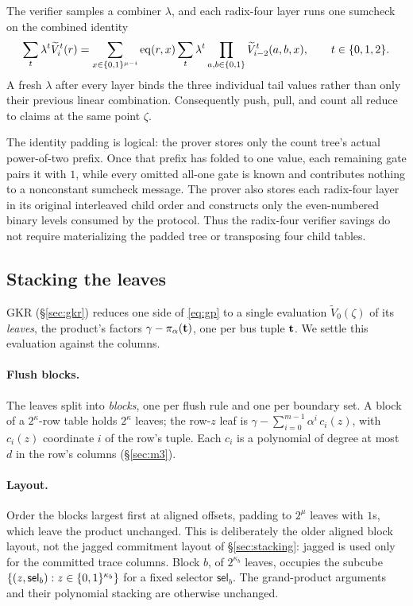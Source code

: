 The verifier samples a combiner $\lambda$, and each radix-four layer runs one sumcheck on the combined identity
\[
\sum_t\lambda^t\widetilde V_i^t(r)=\sum_{x\in\{0,1\}^{\mu-i}}\operatorname{eq}(r,x)\sum_t\lambda^t\prod_{a,b\in\{0,1\}}\widetilde V_{i-2}^t(a,b,x),\qquad t\in\{0,1,2\}.
\]
A fresh $\lambda$ after every layer binds the three individual tail values rather than only their previous linear combination. Consequently push, pull, and count all reduce to claims at the same point $\zeta$.

The identity padding is logical: the prover stores only the count tree's actual power-of-two prefix. Once that prefix has folded to one value, each remaining gate pairs it with $1$, while every omitted all-one gate is known and contributes nothing to a nonconstant sumcheck message. The prover also stores each radix-four layer in its original interleaved child order and constructs only the even-numbered binary levels consumed by the protocol. Thus the radix-four verifier savings do not require materializing the padded tree or transposing four child tables.

\subsection{Stacking the leaves}\label{sec:leafstack}

GKR (\S\ref{sec:gkr}) reduces one side of \eqref{eq:gp} to a single evaluation $\widetilde V_0(\zeta)$ of its \emph{leaves}, the product's factors $\gamma-\pi_\alpha(\mathbf{t})$, one per bus tuple $\mathbf{t}$. We settle this evaluation against the columns.

\paragraph{Flush blocks.} The leaves split into \emph{blocks}, one per flush rule and one per boundary set. A block of a $2^{\kappa}$-row table holds $2^{\kappa}$ leaves; the row-$z$ leaf is $\gamma-\sum_{i=0}^{m-1}\alpha^{i}\,c_{i}(z)$, with $c_{i}(z)$ coordinate $i$ of the row's tuple. Each $c_i$ is a polynomial of degree at most $d$ in the row's columns (\S\ref{sec:m3}).

\paragraph{Layout.} Order the blocks largest first at aligned offsets, padding to $2^{\mu}$ leaves with $1$s, which leave the product unchanged. This is deliberately the older aligned block layout, not the jagged commitment layout of \S\ref{sec:stacking}: jagged is used only for the committed trace columns. Block $b$, of $2^{\kappa_b}$ leaves, occupies the subcube $\{(z,\mathsf{sel}_b):z\in\{0,1\}^{\kappa_b}\}$ for a fixed selector $\mathsf{sel}_b$. The grand-product arguments and their polynomial stacking are otherwise unchanged.

